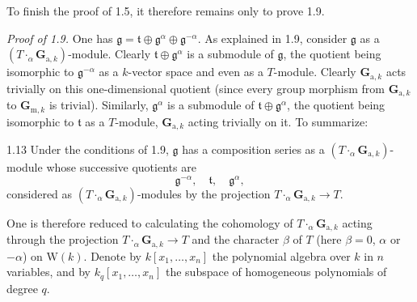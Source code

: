 To finish the proof of 1.5, it therefore remains only to prove 1.9.

 \emph{Proof of 1.9.} One has $\mathfrak g=\mathfrak t\oplus\mathfrak g^\alpha\oplus\mathfrak g^{-\alpha}$. As explained in 1.9, consider $\mathfrak g$ as a $(T\cdot_\alpha\mathbf G_{\mathrm a,k})$-module. Clearly $\mathfrak t\oplus\mathfrak g^\alpha$ is a submodule of $\mathfrak g$, the quotient being isomorphic to $\mathfrak g^{-\alpha}$ as a $k$-vector space and even as a $T$-module. Clearly $\mathbf G_{\mathrm a,k}$ acts trivially on this one-dimensional quotient (since every group morphism from $\mathbf G_{\mathrm a,k}$ to $\mathbf G_{\mathrm m,k}$ is trivial). Similarly, $\mathfrak g^\alpha$ is a submodule of $\mathfrak t\oplus\mathfrak g^\alpha$, the quotient being isomorphic to $\mathfrak t$ as a $T$-module, $\mathbf G_{\mathrm a,k}$ acting trivially on it. To summarize:
\begin{lemma}{1.13}\label{XX.1.13}
Under the conditions of 1.9, $\mathfrak g$ has a composition series as a $(T\cdot_\alpha\mathbf G_{\mathrm a,k})$-module whose successive quotients are
\[
\mathfrak g^{-\alpha},\quad\mathfrak t,\quad\mathfrak g^\alpha,
\]
considered as $(T\cdot_\alpha\mathbf G_{\mathrm a,k})$-modules by the projection $T\cdot_\alpha\mathbf G_{\mathrm a,k}\to T$.
\end{lemma}
One is therefore reduced to calculating the cohomology of $T\cdot_\alpha\mathbf G_{\mathrm a,k}$ acting through the projection $T\cdot_\alpha\mathbf G_{\mathrm a,k}\to T$ and the character $\beta$ of $T$ (here $\beta=0$, $\alpha$ or $-\alpha$) on $\mathrm W(k)$.{\renewcommand{\thefootnote}{(5)}} Denote by $k[x_1,\ldots,x_n]$ the polynomial algebra over $k$ in $n$ variables, and by $k_q[x_1,\ldots,x_n]$ the subspace of homogeneous polynomials of degree $q$.

